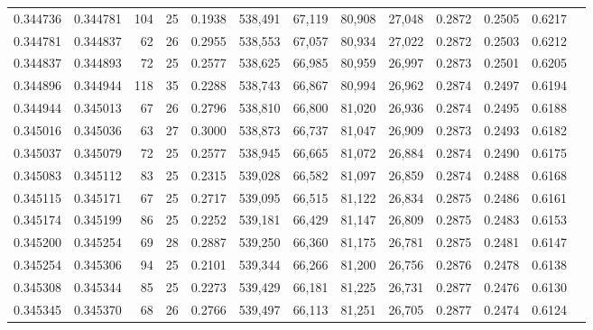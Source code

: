 \begin{tabular}{rrrrrrrrrrrrr}
0.344736 & 0.344781 &   104 &  25 &                                     0.1938 & 538,491 &  67,119 &  80,908 &  27,048 & 0.2872 & 0.2505 & 0.6217 \\
0.344781 & 0.344837 &    62 &  26 &                                     0.2955 & 538,553 &  67,057 &  80,934 &  27,022 & 0.2872 & 0.2503 & 0.6212 \\
0.344837 & 0.344893 &    72 &  25 &                                     0.2577 & 538,625 &  66,985 &  80,959 &  26,997 & 0.2873 & 0.2501 & 0.6205 \\
0.344896 & 0.344944 &   118 &  35 &                                     0.2288 & 538,743 &  66,867 &  80,994 &  26,962 & 0.2874 & 0.2497 & 0.6194 \\
0.344944 & 0.345013 &    67 &  26 &                                     0.2796 & 538,810 &  66,800 &  81,020 &  26,936 & 0.2874 & 0.2495 & 0.6188 \\
0.345016 & 0.345036 &    63 &  27 &                                     0.3000 & 538,873 &  66,737 &  81,047 &  26,909 & 0.2873 & 0.2493 & 0.6182 \\
0.345037 & 0.345079 &    72 &  25 &                                     0.2577 & 538,945 &  66,665 &  81,072 &  26,884 & 0.2874 & 0.2490 & 0.6175 \\
0.345083 & 0.345112 &    83 &  25 &                                     0.2315 & 539,028 &  66,582 &  81,097 &  26,859 & 0.2874 & 0.2488 & 0.6168 \\
0.345115 & 0.345171 &    67 &  25 &                                     0.2717 & 539,095 &  66,515 &  81,122 &  26,834 & 0.2875 & 0.2486 & 0.6161 \\
0.345174 & 0.345199 &    86 &  25 &                                     0.2252 & 539,181 &  66,429 &  81,147 &  26,809 & 0.2875 & 0.2483 & 0.6153 \\
0.345200 & 0.345254 &    69 &  28 &                                     0.2887 & 539,250 &  66,360 &  81,175 &  26,781 & 0.2875 & 0.2481 & 0.6147 \\
0.345254 & 0.345306 &    94 &  25 &                                     0.2101 & 539,344 &  66,266 &  81,200 &  26,756 & 0.2876 & 0.2478 & 0.6138 \\
0.345308 & 0.345344 &    85 &  25 &                                     0.2273 & 539,429 &  66,181 &  81,225 &  26,731 & 0.2877 & 0.2476 & 0.6130 \\
0.345345 & 0.345370 &    68 &  26 &                                     0.2766 & 539,497 &  66,113 &  81,251 &  26,705 & 0.2877 & 0.2474 & 0.6124 \\

\end{tabular}
